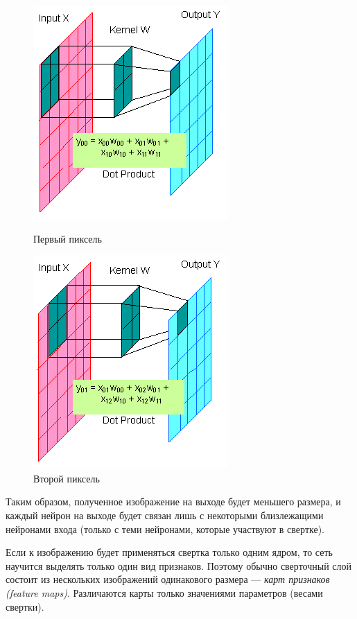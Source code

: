\documentclass[12pt]{article}
\begin{document}
\begin{figure}[h!]
\centering
\begin{minipage}{0.49\linewidth}
\centering
\includegraphics[scale=0.6]{conv1.png}
\caption{Первый пиксель}\label{fig:conv1}
\end{minipage} \hfill
\begin{minipage}{0.49\linewidth}
\centering
\includegraphics[scale=0.6]{conv2.png}
\caption{Второй пиксель}\label{fig:conv2}
\end{minipage}
\end{figure}


Таким образом, полученное изображение на выходе будет меньшего размера, и каждый нейрон на выходе будет связан лишь с некоторыми близлежащими нейронами входа (только с теми нейронами, которые участвуют в свертке). 

Если к изображению будет применяться свертка только одним ядром, то сеть научится выделять только один вид признаков. Поэтому обычно сверточный слой состоит из нескольких изображений одинакового размера --- \textit{карт признаков (feature maps)}. Различаются карты только значениями параметров (весами свертки). 
\end{document}
